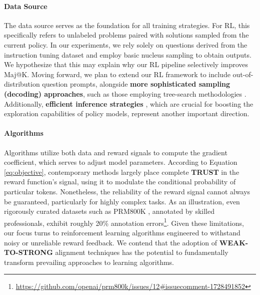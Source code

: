 \paragraph{Data Source} The data source serves as the foundation for all training strategies. For RL, this specifically refers to unlabeled problems paired with solutions sampled from the current policy. In our experiments, we rely solely on questions derived from the instruction tuning dataset and employ basic nucleus sampling to obtain outputs. We hypothesize that this may explain why our RL pipeline selectively improves Maj@K. Moving forward, we plan to extend our RL framework to include out-of-distribution question prompts, alongside \textbf{more sophisticated sampling (decoding) approaches}, such as those employing tree-search methodologies \citep{yao2023tree}. Additionally, \textbf{efficient inference strategies} \citep{xia-etal-2023-speculative,leviathan2023fast,kwon2023efficient,xia2024unlocking}, which are crucial for boosting the exploration capabilities of policy models, represent another important direction.

\paragraph{Algorithms} Algorithms utilize both data and reward signals to compute the gradient coefficient, which serves to adjust model parameters. According to Equation \ref{eq:objective}, contemporary methods largely place complete \textbf{TRUST} in the reward function's signal, using it to modulate the conditional probability of particular tokens. Nonetheless, the reliability of the reward signal cannot always be guaranteed, particularly for highly complex tasks. As an illustration, even rigorously curated datasets such as PRM800K \citep{lightman2023let}, annotated by skilled professionals, exhibit roughly 20\% annotation errors\footnote{\url{https://github.com/openai/prm800k/issues/12\#issuecomment-1728491852}}. Given these limitations, our focus turns to reinforcement learning algorithms engineered to withstand noisy or unreliable reward feedback. We contend that the adoption of \textbf{WEAK-TO-STRONG} \citep{burns2023weak} alignment techniques has the potential to fundamentally transform prevailing approaches to learning algorithms.

